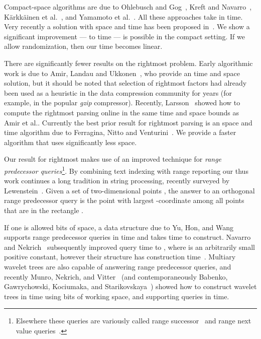 \documentclass[11pt,runningheads]{llncs}
\begin{document}
{Compact-space algorithms are due to Ohlebusch and Gog~\cite{og2011}, Kreft and Navarro~\cite{kn2012}, 
K{\"a}rkk{\"a}inen et al.~\cite{kkp2013-sea}, and Yamamoto et al.~\cite{yibit2014}. 
All these approaches
take in  time. Very recently a solution with  space and  time has been proposed in~\cite{kosolobov2015faster}. 
We show a significant improvement --- to  time --- is possible in the compact
setting. If we allow randomization, then our time becomes linear. 

There are significantly fewer results on the rightmost problem. Early algorithmic work is
due to Amir, Landau and Ukkonen~\cite{alu2002}, who provide an  time and space
solution, but it should be noted that selection of rightmost factors had already been used as a heuristic in the data
compression community for years (for example, in the popular {\em gzip} compressor). Recently,
Larsson~\cite{l2014} showed how to compute the rightmost parsing online in the same
 time and space bounds as Amir et al.. 
Currently the best prior result for rightmost parsing is an
 space and
 time
algorithm due to Ferragina, Nitto and Venturini~\cite{fnv2013}. 
We provide a faster algorithm that uses significantly less space.

Our result for rightmost makes use of an improved technique for 
{\em range predecessor queries}\footnote{Elsewhere these queries are variously called 
range successor~\cite{nn2012} and range next value queries~\cite{CIKRTW12}.}.
By combining text indexing with range reporting our thus work continues a long tradition in string 
processing, recently surveyed by Lewenstein~\cite{l2013}.
Given a set of two-dimensional points , 
the answer to an orthogonal range predecessor query 
is the point  with largest -coordinate among all points that are in the rectangle
. 

If one is allowed  bits of space, a data structure due to Yu, Hon, and Wang~\cite{yhw2011}
supports range predecessor queries in  time and takes 
 time to construct. Navarro and Nekrich~\cite{nn2012}
subsequently improved query time to ,
where  is an arbitrarily small positive constant, however their structure 
has  construction time~\cite{nn2013-private}.
Multiary wavelet trees are also capable of answering range predecessor queries, and
recently Munro, Nekrich, and Vitter~\cite{MNV14} (and contemporaneously Babenko, Gawrychowski, Kociumaka, and 
Starikovskaya~\cite{BGKS15}) showed how to construct wavelet trees 
in  time using  bits of working space, and
supporting queries in  time.

}
\end{document}
